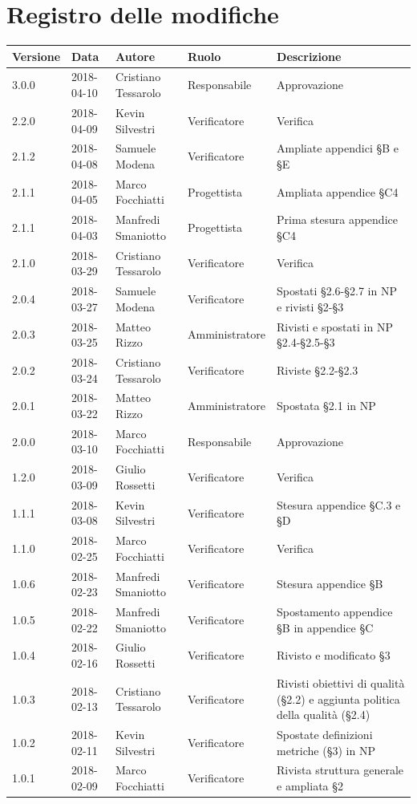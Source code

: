 \documentclass[openany,12pt,a4paper]{report}
\begin{document}
\chapter*{Registro delle modifiche}
\setlength\LTleft{-22mm}
\begin{longtable}{|p{20mm}|p{20mm}|p{40mm}|p{30mm}|p{50mm}|}
	\hline
	\textbf{Versione} & \textbf{Data} & \textbf{Autore} & \textbf{Ruolo} & \textbf{Descrizione} \\
		
		
		\hline 3.0.0 & 2018-04-10 & Cristiano Tessarolo & Responsabile & Approvazione \\
		\hline 2.2.0 & 2018-04-09 & Kevin Silvestri & Verificatore & Verifica \\
		\hline 2.1.2 & 2018-04-08 & Samuele Modena & Verificatore & Ampliate appendici §B e §E \\
		\hline 2.1.1 & 2018-04-05 & Marco Focchiatti & Progettista & Ampliata appendice §C4 \\
		\hline 2.1.1 & 2018-04-03 & Manfredi Smaniotto & Progettista & Prima stesura appendice §C4  \\
		\hline 2.1.0 & 2018-03-29 & Cristiano Tessarolo & Verificatore & Verifica \\
		\hline 2.0.4 & 2018-03-27 & Samuele Modena & Verificatore & Spostati §2.6-§2.7 in NP e rivisti §2-§3 \\
		\hline 2.0.3 & 2018-03-25 & Matteo Rizzo & Amministratore & Rivisti e spostati in NP §2.4-§2.5-§3  \\
		\hline 2.0.2 & 2018-03-24 & Cristiano Tessarolo & Verificatore & Riviste §2.2-§2.3 \\
		\hline 2.0.1 & 2018-03-22 & Matteo Rizzo & Amministratore & Spostata §2.1 in NP \\
		
		\hline
		
		2.0.0 & 2018-03-10 & Marco Focchiatti & Responsabile & Approvazione \\
		\hline 1.2.0 & 2018-03-09 & Giulio Rossetti & Verificatore & Verifica \\
		\hline 1.1.1 & 2018-03-08 & Kevin Silvestri & Verificatore & Stesura appendice §C.3 e §D  \\
		\hline 1.1.0 & 2018-02-25 & Marco Focchiatti & Verificatore & Verifica \\
		\hline 1.0.6 & 2018-02-23 & Manfredi Smaniotto & Verificatore & Stesura appendice §B \\
		\hline 1.0.5 & 2018-02-22 & Manfredi Smaniotto & Verificatore & Spostamento appendice §B in appendice §C \\
		\hline 1.0.4 & 2018-02-16 & Giulio Rossetti & Verificatore & Rivisto e modificato §3 \\
		\hline 1.0.3 & 2018-02-13 & Cristiano Tessarolo & Verificatore & Rivisti obiettivi di qualità (§2.2) e aggiunta politica della qualità (§2.4) \\
		\hline 1.0.2 & 2018-02-11 & Kevin Silvestri & Verificatore & Spostate definizioni metriche (§3) in NP\\
		\hline 1.0.1 & 2018-02-09 & Marco Focchiatti & Verificatore & Rivista struttura generale e ampliata §2 \\
		

\end{longtable}
\end{document}

